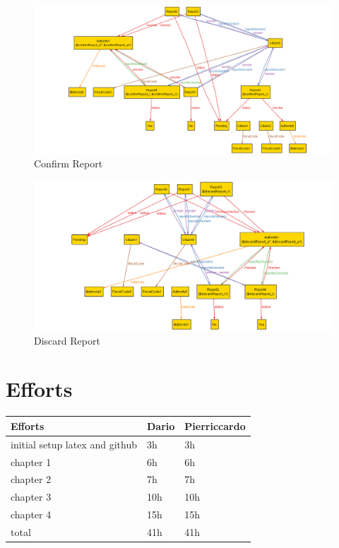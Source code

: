 \documentclass{article}
\begin{document}
\begin{figure}[H]
    \centering
    \includegraphics[scale=0.4]{img/alloy/graphical_confirmReport.png}
    \caption{Confirm Report}
\end{figure}

\begin{figure}[H]
    \centering
    \includegraphics[scale=0.4]{img/alloy/graphical_discardReport.png}
    \caption{Discard Report}
\end{figure}

\section{Efforts}
\begin{center}
    \begin{tabular}{ | l | l | l |}
        \hline
        Efforts & Dario & Pierriccardo \\
        \hline
        initial setup latex and github & 3h & 3h \\
        \hline
        chapter 1 & 6h & 6h \\
        \hline
        chapter 2 & 7h & 7h \\
        \hline
        chapter 3 & 10h & 10h \\
        \hline
        chapter 4 & 15h & 15h \\
        \hline
        total & 41h & 41h \\
        \hline
    \end{tabular}
    \end{center}
\end{document}
